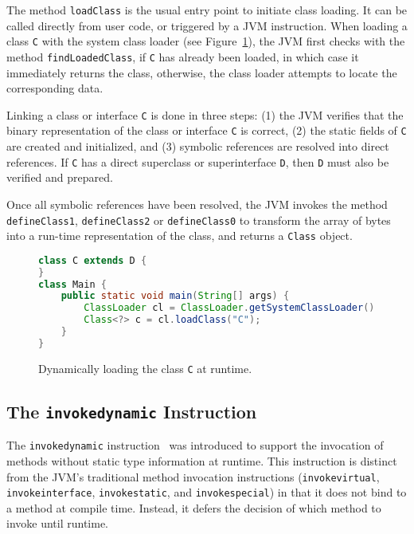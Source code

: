 The method \verb|loadClass| is the usual entry point to initiate class loading. It can be called directly from user code, or triggered by a JVM instruction.
When loading a class \verb|C| with the system class loader (see Figure~\ref{fig:class_C}), the JVM first checks with the method \verb|findLoadedClass|, if \verb|C| has already been loaded, in which case it immediately returns the class, otherwise, the class loader attempts to locate the corresponding data. 

Linking a class or interface \verb|C| is done in three steps: (1) the JVM verifies that the binary representation of the class or interface \verb|C| is correct, (2) the static fields of \verb|C| are created and initialized, and (3) symbolic references are resolved into direct references. If \verb|C| has a direct superclass or superinterface \verb|D|, then \verb|D| must also be verified and prepared. 

Once all symbolic references have been resolved, the JVM invokes the method \verb|defineClass1|, \verb|defineClass2| or \verb|defineClass0| to transform the array of bytes into a run-time representation of the class, and returns a \verb|Class| object.

\begin{figure}[ht]
    \centering
\begin{lstlisting}[language=Java]
class C extends D {
}
class Main {
    public static void main(String[] args) {
        ClassLoader cl = ClassLoader.getSystemClassLoader();
        Class<?> c = cl.loadClass("C");
    }
}
\end{lstlisting}
    \caption{Dynamically loading the class \texttt{C} at runtime.}
    \label{fig:class_C}
\end{figure}

\subsection{The \texttt{invokedynamic} Instruction}
The \verb|invokedynamic| instruction~\cite{noauthor_java_nodate} was introduced to support the invocation of methods without static type information at runtime.
This instruction is distinct from the JVM's traditional method invocation instructions (\verb|invokevirtual|, \verb|invokeinterface|, \verb|invokestatic|, and \verb|invokespecial|) in that it does not bind to a method at compile time. Instead, it defers the decision of which method to invoke until runtime.

